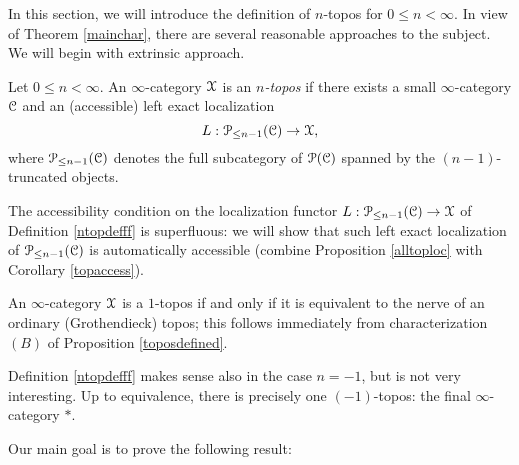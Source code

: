 In this section, we will introduce the definition of $n$-topos for $0 \leq n < \infty$. In view of Theorem \ref{mainchar}, there are several reasonable approaches to the subject. We will begin with extrinsic approach.

\begin{definition}\label{ntopdefff}
Let $0 \leq n < \infty$. An $\infty$-category $\operatorname{\mathcal{X}}$ is an {\it $n$-topos} if there
exists a small $\infty$-category $\operatorname{\mathcal{C}}$ and an (accessible) left exact localization
$$ L: \operatorname{\mathcal{P}}_{\leq n-1}(\operatorname{\mathcal{C}}) \rightarrow \operatorname{\mathcal{X}},$$
where $\operatorname{\mathcal{P}}_{\leq n-1}(\operatorname{\mathcal{C}})$ denotes the full subcategory of $\operatorname{\mathcal{P}}(\operatorname{\mathcal{C}})$ spanned by
the $(n-1)$-truncated objects.
\end{definition}

\begin{remark}
The accessibility condition on the localization functor $L: \operatorname{\mathcal{P}}_{\leq n-1}(\operatorname{\mathcal{C}}) \rightarrow \operatorname{\mathcal{X}}$ of Definition \ref{ntopdefff} is superfluous: we will show that such left exact localization of $\operatorname{\mathcal{P}}_{\leq n-1}(\operatorname{\mathcal{C}})$ is automatically accessible (combine Proposition \ref{alltoploc} with Corollary \ref{topaccess}).
\end{remark}

\begin{remark}
An $\infty$-category $\operatorname{\mathcal{X}}$ is a $1$-topos if and only if it is equivalent to the nerve of an ordinary (Grothendieck) topos; this follows immediately from characterization $(B)$ of Proposition \ref{toposdefined}.
\end{remark}

\begin{remark}
Definition \ref{ntopdefff} makes sense also in the case $n=-1$, but is not very interesting. Up to equivalence, there is precisely one $(-1)$-topos: the final $\infty$-category $\ast$.
\end{remark}

Our main goal is to prove the following result:

